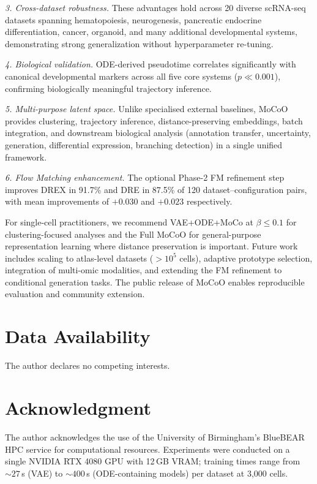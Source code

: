 \documentclass[preprint,12pt,number]{elsarticle}
\begin{document}
\textit{3. Cross-dataset robustness.} These advantages hold across 20 diverse scRNA-seq datasets spanning hematopoiesis, neurogenesis, pancreatic endocrine differentiation, cancer, organoid, and many additional developmental systems, demonstrating strong generalization without hyperparameter re-tuning.

\textit{4. Biological validation.} ODE-derived pseudotime correlates significantly with canonical developmental markers across all five core systems ($p \ll 0.001$), confirming biologically meaningful trajectory inference.

\textit{5. Multi-purpose latent space.} Unlike specialised external baselines, MoCoO provides clustering, trajectory inference, distance-preserving embeddings, batch integration, and downstream biological analysis (annotation transfer, uncertainty, generation, differential expression, branching detection) in a single unified framework.

\textit{6. Flow Matching enhancement.} The optional Phase-2 FM refinement step improves DREX in 91.7\% and DRE in 87.5\% of 120 dataset--configuration pairs, with mean improvements of $+0.030$ and $+0.023$ respectively.

For single-cell practitioners, we recommend VAE+ODE+MoCo at $\beta{\leq}0.1$ for clustering-focused analyses and the Full MoCoO for general-purpose representation learning where distance preservation is important. Future work includes scaling to atlas-level datasets ($>10^5$ cells), adaptive prototype selection, integration of multi-omic modalities, and extending the FM refinement to conditional generation tasks. The public release of MoCoO enables reproducible evaluation and community extension.

\section*{Data Availability}

\appendix

The author declares no competing interests.

\section*{Acknowledgment}
The author acknowledges the use of the University of Birmingham's BlueBEAR HPC service for computational resources. Experiments were conducted on a single NVIDIA RTX 4080 GPU with 12\,GB VRAM; training times range from ${\sim}27$\,s (VAE) to ${\sim}400$\,s (ODE-containing models) per dataset at 3{,}000 cells.
\end{document}

